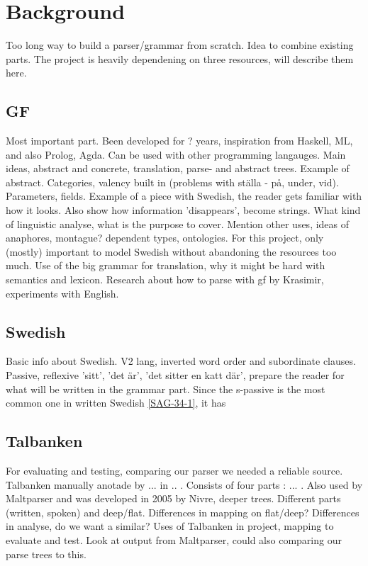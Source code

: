 \documentclass{report}
\begin{document}
\section{Background}  
Too long way to build a parser/grammar from scratch. Idea to combine existing parts. 
The project is heavily dependening on three resources, will describe them here.

\subsection{GF}
Most important part. Been developed for ? years, inspiration from Haskell, ML,
and also Prolog, Agda. Can be used with other programming langauges. 
Main ideas, abstract and concrete, translation, parse- and abstract trees.
Example of abstract.
Categories, valency built in (problems with ställa - på, under, vid). Parameters, fields.
Example of a piece with Swedish, the reader gets familiar with how it looks.
Also show how information 'disappears', become strings.
What kind of linguistic analyse, what is the purpose to cover. Mention other uses,
ideas of anaphores, montague? dependent types, ontologies.
For this project, only (mostly) important to model Swedish without abandoning the
resources too much. Use of the big grammar for translation, why it might be hard with
semantics and lexicon.
Research about how to parse with gf by Krasimir, experiments with English.

\subsection{Swedish}
Basic info about Swedish. V2 lang, inverted word order and subordinate clauses.
Passive, reflexive 'sitt', 'det är', 'det sitter en katt där', prepare the reader
for what will be written in the grammar part.
Since the s-passive is the most common one in written Swedish \ref{SAG-34-1}, it has

\subsection{Talbanken}
For evaluating and testing, comparing our parser we needed a reliable source.
Talbanken manually anotade by ... in .. . Consists of four parts : ... . 
Also used by Maltparser and was developed in 2005 by Nivre, deeper trees.
Different parts (written, spoken) and deep/flat. Differences in mapping
on flat/deep?
Differences in analyse, do we want a similar? 
Uses of Talbanken in project, mapping to evaluate and test.  
Look at output from Maltparser, could also comparing our parse trees to this.
\end{document}
